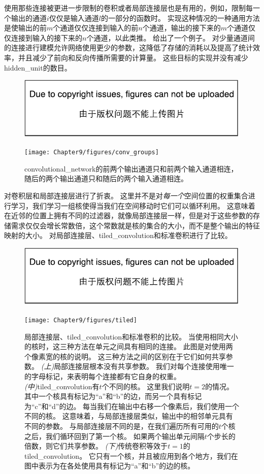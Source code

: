 使用那些连接被更进一步限制的卷积或者局部连接层也是有用的，例如，限制每一个输出的通道$i$仅仅是输入通道$l$的一部分的函数时。
实现这种情况的一种通用方法是使输出的前$m$个通道仅仅连接到输入的前$n$个通道，输出的接下来的$m$个通道仅仅连接到输入的接下来的$n$个通道，以此类推。
给出了一个例子。
对少量通道间的连接进行建模允许网络使用更少的参数，这降低了存储的消耗以及提高了统计效率，并且减少了前向和反向传播所需要的计算量。
这些目标的实现并没有减少\gls{hidden_unit}的数目。
\begin{figure}[!htb]
\ifOpenSource
\centerline{\includegraphics{figure.pdf}}
\else
\centerline{\texttt{[image: Chapter9/figures/conv\_groups]}}
\fi
\caption{\gls{convolutional_network}的前两个输出通道只和前两个输入通道相连，随后的两个输出通道只和随后的两个输入通道相连。}
\label{fig:chap9_conv_groups}
\end{figure}

\citep{Gregor+LeCun-2010,Le2010}对卷积层和局部连接层进行了折衷。
这里并不是对\emph{每一个}空间位置的权重集合进行学习，我们学习一组核使得当我们在空间移动时它们可以循环利用。
这意味着在近邻的位置上拥有不同的过滤器，就像局部连接层一样，但是对于这些参数的存储需求仅仅会增长常数倍，这个常数就是核的集合的大小，而不是整个输出的特征映射的大小。
对局部连接层、\gls{tiled_convolution}和标准卷积进行了比较。
\begin{figure}[!htb]
\ifOpenSource
\centerline{\includegraphics{figure.pdf}}
\else
\centerline{\texttt{[image: Chapter9/figures/tiled]}}
\fi
\captionsetup{singlelinecheck=off}
\caption[.]{局部连接层、\gls{tiled_convolution}和标准卷积的比较。
当使用相同大小的核时，这三种方法在单元之间具有相同的连接。
此图是对使用两个像素宽的核的说明。
这三种方法之间的区别在于它们如何共享参数。
\emph{(上)}局部连接层根本没有共享参数。
我们对每个连接使用唯一的字母标记，来表明每个连接都有它自身的权重。
\emph{(中)}\gls{tiled_convolution}有$t$个不同的核。
这里我们说明$t=2$的情况。
其中一个核具有标记为``a''和``b''的边，而另一个具有标记为``c''和``d''的边。
每当我们在输出中右移一个像素后，我们使用一个不同的核。
这意味着，与局部连接层类似，输出中的相邻单元具有不同的参数。
与局部连接层不同的是，在我们遍历所有可用的$t$个核之后，我们循环回到了第一个核。
如果两个输出单元间隔$t$个步长的倍数，则它们共享参数。
\emph{(下)}传统卷积等效于$t=1$的\gls{tiled_convolution}。
它只有一个核，并且被应用到各个地方，我们在图中表示为在各处使用具有标记为``a''和``b''的边的核。}
\label{fig:chap9_tiled}
\end{figure}
 
